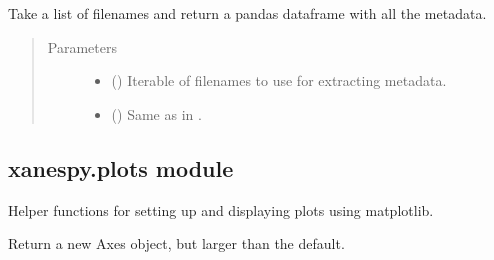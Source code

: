 \documentclass[letterpaper,10pt,english]{sphinxmanual}
\begin{document}
\begin{fulllineitems}
\label{\detokenize{xanespy:xanespy.importers.read_metadata}}
Take a list of filenames and return a pandas dataframe with all the
metadata.
\begin{quote}\begin{description}
\item[{Parameters}] \leavevmode\begin{itemize}
\item {} 
 () \textendash{} Iterable of filenames to use for extracting metadata.

\item {} 
 () \textendash{} Same as in .

\end{itemize}

\end{description}\end{quote}

\end{fulllineitems}



\subsection{xanespy.plots module}
\label{\detokenize{xanespy:xanespy-plots-module}}\label{\detokenize{xanespy:module-xanespy.plots}}
Helper functions for setting up and displaying plots using matplotlib.

\begin{fulllineitems}
\label{\detokenize{xanespy:xanespy.plots.big_axes}}
Return a new Axes object, but larger than the default.

\end{fulllineitems}

\end{document}
